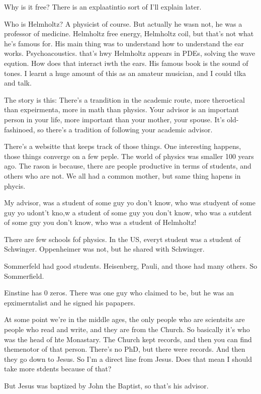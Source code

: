 Why is it free? There is an explaatintio sort of I'll explain later.

Who is Helmholtz?
A physicist of course.
But actually he wasn not,
he was a professor of medicine.
Helmholtz free energy,
Helmholtz coil,
but that's not what he's famous for.
His main thing was to understand how to understand the ear works.
Psychoacoustics.
that's hwy Helmholtz appears in PDEs,
solving the wave eqution.
How does that interact iwth the ears.
His famous book is the sound of tones.
I learnt a huge amount of this as an amateur musician,
and I could tlka and talk.

The story is this:
There's a trandition in the academic route,
more theroetical than expeirmenta,
more in math than physics.
Your advisor is an important person in your life,
more important than your mother, your spouse.
It's old-fashinoed,
so there's a tradition of following your academic advisor.

There's a websitte that keeps track of those things.
One interesting happens,
those things converge on a few peple.
The world of physics was smaller 100 years ago.
The rason is because,
there are people productive in terms of students,
and others who are not.
We all had a common mother,
but same thing hapens in phycis.

My advisor,
was a student of some guy yo don't know,
who was studyent of some guy yo udont't kno,w
a student of some guy you don't know,
who was a sutdent of some guy you don't know,
who was a student of Helmholtz!

There are few schools fof physics.
In the US,
everyt student was a student of Schwinger.
Oppenheimer was not,
but he shared with Schwinger.

Sommerfeld had good students.
Heisenberg, Pauli,
and those had many others.
So Sommerfield.

Einstine has 0 zeros.
There was one guy who claimed to be,
but he was an epximerntalist and he signed his papapers.

At some point we're in the middle ages,
the only people who are scientsits are people who read and write,
and they are from the Church.
So basically it's who was the head of hte Monastary.
The Church kept records,
and then you can find themenotor of that person.
There's no PhD,
but there were records.
And then they go down to Jesus.
So I'm a direct line from Jesus.
Does that mean I should take more stdents because of that?

But Jesus was baptized by John the Baptist,
so that's his advisor.


